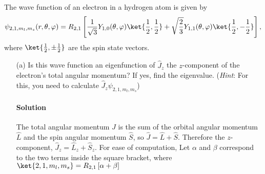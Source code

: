 \documentclass{article}
\numberwithin{equation}{section}
\begin{document}
	The wave function of an electron in a hydrogen atom is given by
	\begin{equation}
		\psi_{2,1,m_l,m_s}(r,\theta,\varphi) = R_{2,1} \left[ \frac{1}{\sqrt{3}} Y_{1,0}(\theta,\varphi) \ket{\frac{1}{2}, \frac{1}{2}} + \sqrt{\frac{2}{3}} Y_{1,1}(\theta,\varphi) \ket{\frac{1}{2}, -\frac{1}{2}} \right],
	\end{equation}
	where $\ket{\frac{1}{2} , \pm\frac{1}{2}}$ are the spin state vectors.
	\begin{enumerate}
		\item[(a)] Is this wave function an eigenfunction of $\hat{J}_z$ the $z$-component of the electron’s total angular momentum? If yes, find the eigenvalue. (\textit{Hint}: For this, you need to calculate $\hat{J}_z \psi_{2,1,m_l,m_s}$) 
		\paragraph{Solution} The total angular momentum $\hat{J}$ is the sum of the orbital angular momentum $\hat{L}$ and the spin angular momentum $\hat{S}$, so $\hat{J} = \hat{L} + \hat{S}$. Therefore the $z$-component, $\hat{J}_z = \hat{L}_z + \hat{S}_z$. For ease of computation, Let $\alpha$ and $\beta$ correspond to the two terms inside the square bracket, where $\ket{2,1,m_l,m_s} = R_{2,1} \left[ \alpha + \beta \right]$

\end{enumerate}
\end{document}
